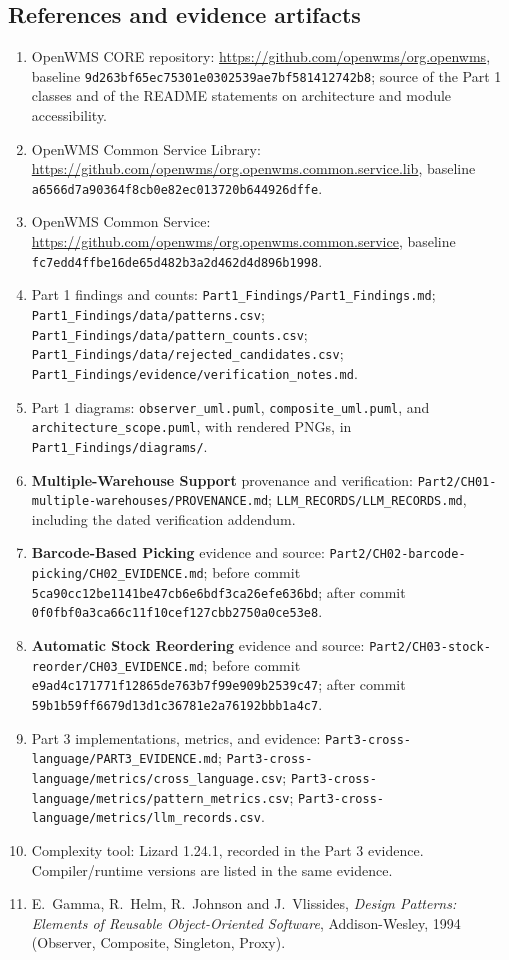 \documentclass[11pt,a4paper]{article}
\newcommand{\code}[1]{\nolinkurl{#1}}
\begin{document}
\subsection{References and evidence artifacts}
\begin{enumerate}[leftmargin=*,nosep]
\item OpenWMS CORE repository: \url{https://github.com/openwms/org.openwms}, baseline \code{9d263bf65ec75301e0302539ae7bf581412742b8}; source of the Part 1 classes and of the README statements on architecture and module accessibility.
\item OpenWMS Common Service Library: \url{https://github.com/openwms/org.openwms.common.service.lib}, baseline \code{a6566d7a90364f8cb0e82ec013720b644926dffe}.
\item OpenWMS Common Service: \url{https://github.com/openwms/org.openwms.common.service}, baseline \code{fc7edd4ffbe16de65d482b3a2d462d4d896b1998}.
\item Part 1 findings and counts: \code{Part1_Findings/Part1_Findings.md}; \code{Part1_Findings/data/patterns.csv}; \code{Part1_Findings/data/pattern_counts.csv}; \code{Part1_Findings/data/rejected_candidates.csv}; \code{Part1_Findings/evidence/verification_notes.md}.
\item Part 1 diagrams: \code{observer_uml.puml}, \code{composite_uml.puml}, and \code{architecture_scope.puml}, with rendered PNGs, in \code{Part1_Findings/diagrams/}.
\item \textbf{Multiple-Warehouse Support} provenance and verification: \code{Part2/CH01-multiple-warehouses/PROVENANCE.md}; \code{LLM_RECORDS/LLM_RECORDS.md}, including the dated verification addendum.
\item \textbf{Barcode-Based Picking} evidence and source: \code{Part2/CH02-barcode-picking/CH02_EVIDENCE.md}; before commit \code{5ca90cc12be1141be47cb6e6bdf3ca26efe636bd}; after commit \code{0f0fbf0a3ca66c11f10cef127cbb2750a0ce53e8}.
\item \textbf{Automatic Stock Reordering} evidence and source: \code{Part2/CH03-stock-reorder/CH03_EVIDENCE.md}; before commit \code{e9ad4c171771f12865de763b7f99e909b2539c47}; after commit \code{59b1b59ff6679d13d1c36781e2a76192bbb1a4c7}.
\item Part 3 implementations, metrics, and evidence: \code{Part3-cross-language/PART3_EVIDENCE.md}; \code{Part3-cross-language/metrics/cross_language.csv}; \code{Part3-cross-language/metrics/pattern_metrics.csv}; \code{Part3-cross-language/metrics/llm_records.csv}.
\item Complexity tool: Lizard 1.24.1, recorded in the Part 3 evidence. Compiler/runtime versions are listed in the same evidence.
\item E.~Gamma, R.~Helm, R.~Johnson and J.~Vlissides, \textit{Design Patterns: Elements of Reusable Object-Oriented Software}, Addison-Wesley, 1994 (Observer, Composite, Singleton, Proxy).
\end{enumerate}
\end{document}

